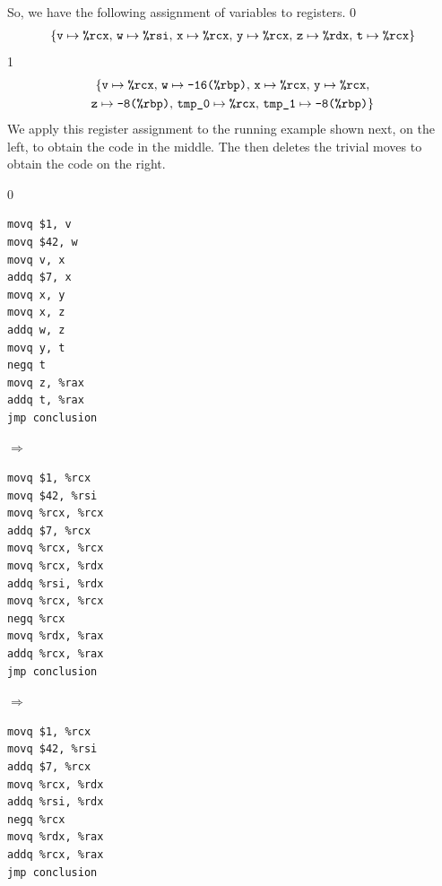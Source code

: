 \documentclass[7x10]{TimesAPriori_MIT}%
\def\racketEd{0}
\def\pythonEd{1}
\def\edition{1}
\newcommand{\pythonColor}[0]{}
\numberwithin{theorem}{chapter}
\numberwithin{definition}{chapter}
\numberwithin{equation}{chapter}
\begin{document}
So, we have the following assignment of variables to registers.
{\if\edition\racketEd
\begin{gather*}
  \{ \text{\texttt{v}} \mapsto \texttt{\%rcx}, \,
     \text{\texttt{w}} \mapsto \texttt{\%rsi}, \,
     \text{\texttt{x}} \mapsto \texttt{\%rcx}, \,
     \text{\texttt{y}} \mapsto \texttt{\%rcx}, \,
     \text{\texttt{z}} \mapsto \texttt{\%rdx}, \,
     \text{\texttt{t}} \mapsto \texttt{\%rcx} \}
\end{gather*}
\fi}
{\if\edition\pythonEd\pythonColor
\begin{gather*}
  \{ \text{\texttt{v}} \mapsto \texttt{\%rcx}, \,
     \text{\texttt{w}} \mapsto \texttt{-16(\%rbp)}, \,
     \text{\texttt{x}} \mapsto \texttt{\%rcx}, \,
     \text{\texttt{y}} \mapsto \texttt{\%rcx}, \\
     \text{\texttt{z}} \mapsto \texttt{-8(\%rbp)}, \,
     \text{\texttt{tmp\_0}} \mapsto \texttt{\%rcx}, \,
     \text{\texttt{tmp\_1}} \mapsto \texttt{-8(\%rbp)} \}
\end{gather*}
\fi}
%
We apply this register assignment to the running example shown next,
on the left, to obtain the code in the middle.  The
 then deletes the trivial moves to obtain
the code on the right.

{\if\edition\racketEd
\begin{center}  
\begin{minipage}{0.2\textwidth}
\begin{lstlisting}
movq $1, v
movq $42, w
movq v, x
addq $7, x
movq x, y
movq x, z
addq w, z
movq y, t
negq t
movq z, %rax
addq t, %rax
jmp conclusion
\end{lstlisting}
\end{minipage}
$\Rightarrow\qquad$
\begin{minipage}{0.25\textwidth}
\begin{lstlisting}
movq $1, %rcx
movq $42, %rsi
movq %rcx, %rcx
addq $7, %rcx
movq %rcx, %rcx
movq %rcx, %rdx
addq %rsi, %rdx
movq %rcx, %rcx
negq %rcx
movq %rdx, %rax
addq %rcx, %rax
jmp conclusion
\end{lstlisting}
\end{minipage}
$\Rightarrow\qquad$
\begin{minipage}{0.23\textwidth}
\begin{lstlisting}
movq $1, %rcx
movq $42, %rsi
addq $7, %rcx
movq %rcx, %rdx
addq %rsi, %rdx
negq %rcx
movq %rdx, %rax
addq %rcx, %rax
jmp conclusion
\end{lstlisting}
\end{minipage}
\end{center}
\fi}
\end{document}
